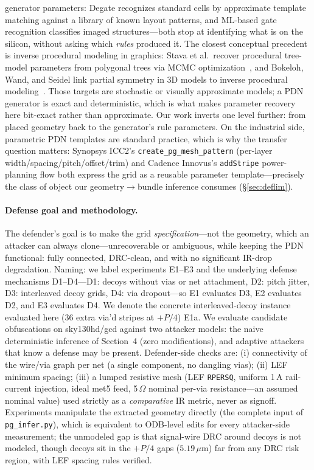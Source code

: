 \documentclass[11pt]{article}
\begin{document}
generator parameters: Degate recognizes standard cells by approximate
template matching against a library of known layout patterns, and
ML-based gate recognition classifies imaged structures---both stop at
identifying what is on the silicon, without asking which \emph{rules}
produced it.  The closest conceptual precedent is inverse procedural
modeling in graphics: Stava et al.\ recover procedural tree-model
parameters from polygonal trees via MCMC
optimization~\cite{stava2014}, and Bokeloh, Wand, and Seidel link partial
symmetry in 3D models to inverse procedural
modeling~\cite{bokeloh2010}.  Those targets are stochastic or visually
approximate models; a PDN generator is exact and deterministic, which is
what makes parameter recovery here bit-exact rather than approximate.
Our work inverts one level further: from placed geometry
back to the generator's rule parameters.  On the industrial side,
parametric PDN templates are standard practice, which is why the
transfer question matters: Synopsys ICC2's
\texttt{create\_pg\_mesh\_pattern} (per-layer width/spacing/pitch/offset/trim)
and Cadence Innovus's \texttt{addStripe} power-planning flow both express
the grid as a reusable parameter template---precisely the class of object
our geometry$\to$bundle inference consumes (\S\ref{sec:deflim}).

\paragraph{Defense goal and methodology.} The defender's goal is to make
the grid \emph{specification}---not the geometry, which an attacker can
always clone---unrecoverable or ambiguous, while keeping the PDN
functional: fully connected, DRC-clean, and with no significant IR-drop
degradation.  Naming: we label experiments E1--E3 and the underlying
defense mechanisms D1--D4---D1: decoys without
vias or net attachment, D2: pitch jitter, D3: interleaved decoy grids,
D4: via dropout---so E1 evaluates D3, E2 evaluates D2, and E3 evaluates
D4.  We denote the concrete interleaved-decoy instance evaluated here
(36 extra via'd stripes at $+P/4$) E1a.  We evaluate candidate obfuscations on sky130hd/gcd against
two attacker models: the naive deterministic inference of
Section~4 (zero modifications), and adaptive attackers that know a
defense may be present.  Defender-side checks are: (i) connectivity of
the wire/via graph per net (a single component, no dangling vias); (ii)
LEF minimum spacing; (iii) a lumped resistive mesh (LEF
\texttt{RPERSQ}, uniform 1\,A rail-current injection, ideal met5 feed,
5\,$\Omega$ nominal per-via resistance---an assumed nominal value) used
strictly as a \emph{comparative} IR metric, never as signoff.  Experiments manipulate
the extracted geometry directly (the complete input of
\texttt{pg\_infer.py}), which is equivalent to ODB-level edits for every
attacker-side measurement; the unmodeled gap is that signal-wire DRC around
decoys is not modeled, though decoys sit in the $+P/4$ gaps
($5.19\,\mu\mathrm{m}$) far from any DRC risk region, with LEF spacing
rules verified.
\end{document}
